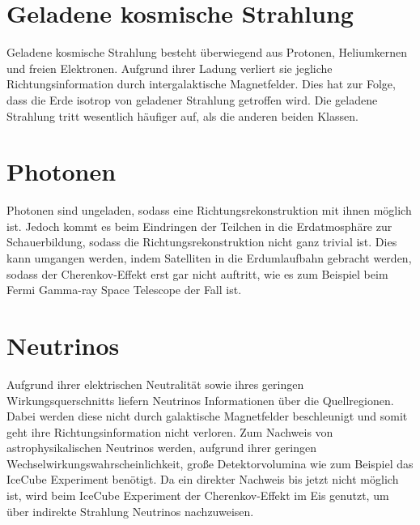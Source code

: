 \section{Geladene kosmische Strahlung}
Geladene kosmische Strahlung besteht überwiegend aus Protonen, Heliumkernen und freien Elektronen. 
Aufgrund ihrer Ladung verliert sie jegliche Richtungsinformation durch intergalaktische Magnetfelder. 
Dies hat zur Folge, dass die Erde isotrop von geladener Strahlung getroffen wird.
Die geladene Strahlung tritt wesentlich häufiger auf, als die anderen beiden Klassen. 

\section{Photonen}
Photonen sind ungeladen, sodass eine Richtungsrekonstruktion mit ihnen möglich ist. 
Jedoch kommt es beim Eindringen der Teilchen in die Erdatmosphäre zur Schauerbildung, sodass die Richtungsrekonstruktion nicht ganz trivial ist. 
Dies kann umgangen werden, indem Satelliten in die Erdumlaufbahn gebracht werden, sodass der Cherenkov-Effekt erst gar nicht auftritt, wie es zum Beispiel beim Fermi Gamma-ray Space Telescope der Fall ist.

\section{Neutrinos}
Aufgrund ihrer elektrischen Neutralität sowie ihres geringen Wirkungsquerschnitts liefern Neutrinos Informationen über die Quellregionen. 
Dabei werden diese nicht durch galaktische Magnetfelder beschleunigt und somit geht ihre Richtungsinformation nicht verloren. 
Zum Nachweis von astrophysikalischen Neutrinos werden, aufgrund ihrer geringen Wechselwirkungswahrscheinlichkeit, große Detektorvolumina wie zum Beispiel das IceCube Experiment benötigt.
Da ein direkter Nachweis bis jetzt nicht möglich ist, wird beim IceCube Experiment der Cherenkov-Effekt im Eis genutzt, um über indirekte Strahlung Neutrinos nachzuweisen.
